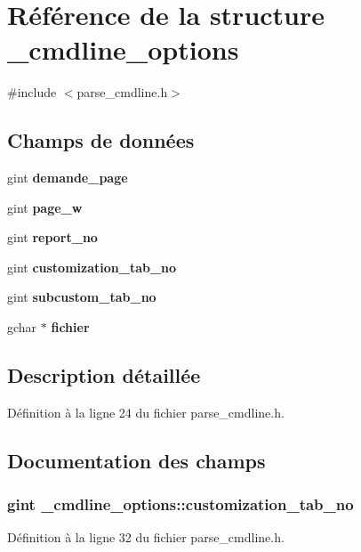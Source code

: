 \section{Référence de la structure \_\-cmdline\_\-options}
\label{struct__cmdline__options}


{\ttfamily \#include $<$parse\_\-cmdline.h$>$}

\subsection*{Champs de données}
\begin{DoxyCompactItemize}
\item 
gint {\bf demande\_\-page}
\item 
gint {\bf page\_\-w}
\item 
gint {\bf report\_\-no}
\item 
gint {\bf customization\_\-tab\_\-no}
\item 
gint {\bf subcustom\_\-tab\_\-no}
\item 
gchar $\ast$ {\bf fichier}
\end{DoxyCompactItemize}


\subsection{Description détaillée}


Définition à la ligne 24 du fichier parse\_\-cmdline.h.



\subsection{Documentation des champs}
\subsubsection[{customization\_\-tab\_\-no}]{\setlength{\rightskip}{0pt plus 5cm}gint {\bf \_\-cmdline\_\-options::customization\_\-tab\_\-no}}\label{struct__cmdline__options_ae4d0b95438eee9ae52740d9e1a7b2774}


Définition à la ligne 32 du fichier parse\_\-cmdline.h.


